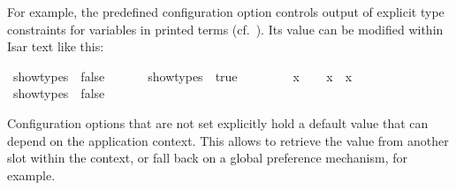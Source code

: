 \begin{isabellebody}
\begin{isamarkuptext}
  For example, the predefined configuration option \hyperlink{attribute.show-types}{\mbox{}} controls output of explicit type constraints for
  variables in printed terms (cf.\ ).  Its
  value can be modified within Isar text like this:%
\end{isamarkuptext}%
\isamarkuptrue%
\isamarkupfalse%
\ {}{}show{}types\ {}\ false{}{}\isanewline
\ \ %
\isanewline
\isanewline
{}\isamarkupfalse%
\isanewline
{}\isanewline
%
\isadelimproof
\ \ %
\endisadelimproof
%
\isatagproof
{}\isamarkupfalse%
\ {}{}show{}types\ {}\ true{}{}\isanewline
\ \ \ \ %
%
\endisatagproof
{\isafoldproof}%
%
\isadelimproof
\isanewline
%
\endisadelimproof
\ \ \isamarkupfalse%
\ x\isanewline
%
\isadelimproof
\isanewline
\ \ %
\endisadelimproof
%
\isatagproof
{}\isamarkupfalse%
\ {}x\ {}\ x{}\isanewline
\ \ \ \ \isamarkupfalse%
\ {}{}show{}types\ {}\ false{}{}\isanewline
\ \ \ \ \ \ %
\isanewline
\ \ \ \ \isamarkupfalse%
%
\endisatagproof
{\isafoldproof}%
%
\isadelimproof
\isanewline
%
\endisadelimproof
{}\isamarkupfalse%
%
\begin{isamarkuptext}%
Configuration options that are not set explicitly hold a
  default value that can depend on the application context.  This
  allows to retrieve the value from another slot within the context,
  or fall back on a global preference mechanism, for example.


\end{isamarkuptext}
\end{isabellebody}
